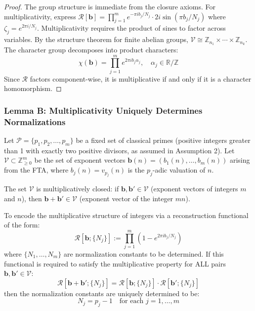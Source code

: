 \begin{proof}
The group structure is immediate from the closure axioms. For multiplicativity, express $\mathcal{R}[\mathbf{b}] = \prod_{j=1}^m e^{-\pi i b_j/N_j} \cdot 2i \sin(\pi b_j/N_j)$ where $\zeta_j = e^{2\pi i/N_j}$. Multiplicativity requires the product of sines to factor across variables. By the structure theorem for finite abelian groups, $\mathcal{V} \cong \mathbb{Z}_{n_1} \times \cdots \times \mathbb{Z}_{n_k}$. The character group decomposes into product characters:
\begin{equation}
\chi(\mathbf{b}) = \prod_{j=1}^m e^{2\pi i b_j \alpha_j}, \quad \alpha_j \in \mathbb{R}/\mathbb{Z}
\end{equation}
Since $\mathcal{R}$ factors component-wise, it is multiplicative if and only if it is a character homomorphism.
\end{proof}

\subsubsection{Lemma B: Multiplicativity Uniquely Determines Normalizations}
\label{subsubsec:lemma-b-resonance}

\begin{lemma}
\label{lem:multiplicativity-primes}
Let $\mathcal{P} = \{p_1, p_2, \ldots, p_m\}$ be a fixed set of classical primes (positive integers greater than 1 with exactly two positive divisors, as assumed in Assumption 2). Let $\mathcal{V} \subset \mathbb{Z}^m_{\geq 0}$ be the set of exponent vectors $\mathbf{b}(n) = (b_1(n), \ldots, b_m(n))$ arising from the FTA, where $b_j(n) = v_{p_j}(n)$ is the $p_j$-adic valuation of $n$.

The set $\mathcal{V}$ is multiplicatively closed: if $\mathbf{b}, \mathbf{b}' \in \mathcal{V}$ (exponent vectors of integers $m$ and $n$), then $\mathbf{b} + \mathbf{b}' \in \mathcal{V}$ (exponent vector of the integer $mn$).

To encode the multiplicative structure of integers via a reconstruction functional of the form:
\begin{equation}
\mathcal{R}[\mathbf{b}; \{N_j\}] := \prod_{j=1}^m \left(1 - e^{2\pi i b_j / N_j}\right)
\end{equation}
where $\{N_1, \ldots, N_m\}$ are normalization constants to be determined. If this functional is required to satisfy the multiplicative property for ALL pairs $\mathbf{b}, \mathbf{b}' \in \mathcal{V}$:
\begin{equation}
\mathcal{R}[\mathbf{b} + \mathbf{b}'; \{N_j\}] = \mathcal{R}[\mathbf{b}; \{N_j\}] \cdot \mathcal{R}[\mathbf{b}';\{N_j\}]
\end{equation}
then the normalization constants are uniquely determined to be:
\begin{equation}
N_j = p_j - 1 \quad \text{for each } j = 1, \ldots, m
\end{equation}
\end{lemma}

